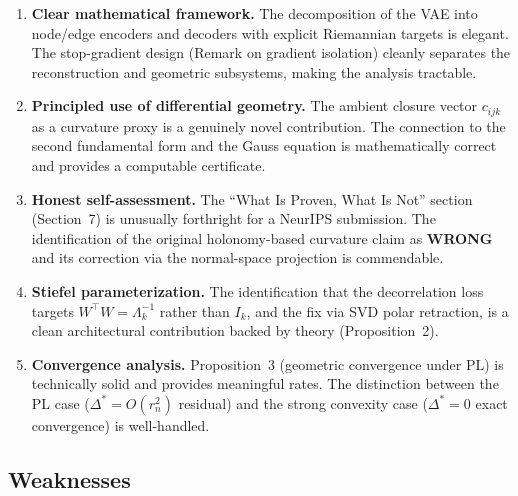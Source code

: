 \documentclass{article}
\begin{document}
\begin{enumerate}[label=(S\arabic*)]
\item \textbf{Clear mathematical framework.}
  The decomposition of the VAE into node/edge encoders and decoders with
  explicit Riemannian targets is elegant. The stop-gradient design
  (Remark on gradient isolation) cleanly separates the reconstruction and
  geometric subsystems, making the analysis tractable.

\item \textbf{Principled use of differential geometry.}
  The ambient closure vector $c_{ijk}$ as a curvature proxy is a genuinely
  novel contribution. The connection to the second fundamental form and the
  Gauss equation is mathematically correct and provides a computable certificate.

\item \textbf{Honest self-assessment.}
  The ``What Is Proven, What Is Not'' section (Section~7) is unusually
  forthright for a NeurIPS submission. The identification of the original
  holonomy-based curvature claim as \textbf{WRONG} and its correction via
  the normal-space projection is commendable.

\item \textbf{Stiefel parameterization.}
  The identification that the decorrelation loss targets $W^\top W = \Lambda_k^{-1}$
  rather than $I_k$, and the fix via SVD polar retraction, is a clean
  architectural contribution backed by theory (Proposition~2).

\item \textbf{Convergence analysis.}
  Proposition~3 (geometric convergence under PL) is technically solid and
  provides meaningful rates. The distinction between the PL case
  ($\Delta^* = O(r_n^2)$ residual) and the strong convexity case
  ($\Delta^* = 0$ exact convergence) is well-handled.
\end{enumerate}

\subsection{Weaknesses}
\end{document}
